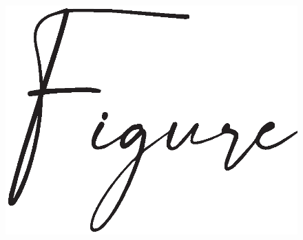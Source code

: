 \documentclass[10pt, a4paper]{article}
\begin{document}
	\clearpage
	\newpage



	
	\begin{figure}
		\centering
		
			\includegraphics[scale=1]{figures/figure.eps}
		
		\caption{}		
	\end{figure}

	


	
	
	
	

	
	
	
\end{document}
